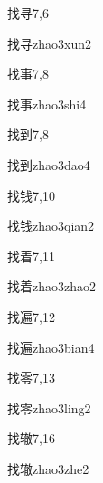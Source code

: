 \begin{entry}{找寻}{7,6}
  \begin{phonetics}{找寻}{zhao3xun2}
  \end{phonetics}
\end{entry}

\begin{entry}{找事}{7,8}
  \begin{phonetics}{找事}{zhao3shi4}
  \end{phonetics}
\end{entry}

\begin{entry}{找到}{7,8}
  \begin{phonetics}{找到}{zhao3dao4}
  \end{phonetics}
\end{entry}

\begin{entry}{找钱}{7,10}
  \begin{phonetics}{找钱}{zhao3qian2}
  \end{phonetics}
\end{entry}

\begin{entry}{找着}{7,11}
  \begin{phonetics}{找着}{zhao3zhao2}
  \end{phonetics}
\end{entry}

\begin{entry}{找遍}{7,12}
  \begin{phonetics}{找遍}{zhao3bian4}
  \end{phonetics}
\end{entry}

\begin{entry}{找零}{7,13}
  \begin{phonetics}{找零}{zhao3ling2}
  \end{phonetics}
\end{entry}

\begin{entry}{找辙}{7,16}
  \begin{phonetics}{找辙}{zhao3zhe2}
  \end{phonetics}
\end{entry}

